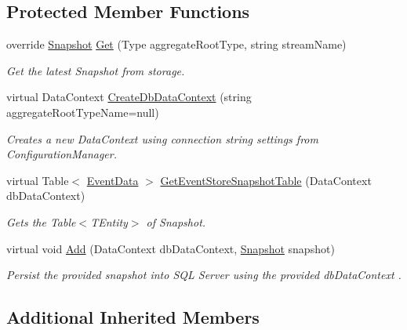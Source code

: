 \subsection*{Protected Member Functions}
\begin{DoxyCompactItemize}
\item 
override \hyperlink{classCqrs_1_1Snapshots_1_1Snapshot}{Snapshot} \hyperlink{classCqrs_1_1Events_1_1SqlSnapshotStore_a074064fc96d192dd6f68be2bb941bb9f_a074064fc96d192dd6f68be2bb941bb9f}{Get} (Type aggregate\+Root\+Type, string stream\+Name)
\begin{DoxyCompactList}\small\item\em Get the latest Snapshot from storage. \end{DoxyCompactList}\item 
virtual Data\+Context \hyperlink{classCqrs_1_1Events_1_1SqlSnapshotStore_a3127cd1a8a082be777a3fae0fdbd41dc_a3127cd1a8a082be777a3fae0fdbd41dc}{Create\+Db\+Data\+Context} (string aggregate\+Root\+Type\+Name=null)
\begin{DoxyCompactList}\small\item\em Creates a new Data\+Context using connection string settings from Configuration\+Manager. \end{DoxyCompactList}\item 
virtual Table$<$ \hyperlink{classCqrs_1_1Events_1_1EventData}{Event\+Data} $>$ \hyperlink{classCqrs_1_1Events_1_1SqlSnapshotStore_a769ac716875ad2216085698d08ead1c2_a769ac716875ad2216085698d08ead1c2}{Get\+Event\+Store\+Snapshot\+Table} (Data\+Context db\+Data\+Context)
\begin{DoxyCompactList}\small\item\em Gets the Table$<$\+T\+Entity$>$ of Snapshot. \end{DoxyCompactList}\item 
virtual void \hyperlink{classCqrs_1_1Events_1_1SqlSnapshotStore_a95ea217953dc530ce348595007fb3305_a95ea217953dc530ce348595007fb3305}{Add} (Data\+Context db\+Data\+Context, \hyperlink{classCqrs_1_1Snapshots_1_1Snapshot}{Snapshot} snapshot)
\begin{DoxyCompactList}\small\item\em Persist the provided {\itshape snapshot}  into S\+QL Server using the provided {\itshape db\+Data\+Context} . \end{DoxyCompactList}\end{DoxyCompactItemize}
\subsection*{Additional Inherited Members}


